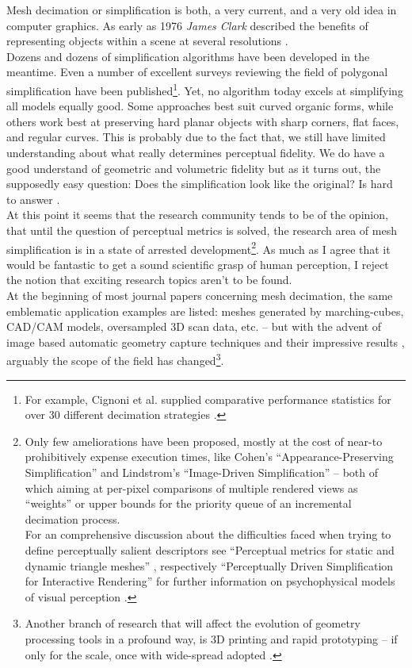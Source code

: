 Mesh decimation or simplification is both, a very current, and a very old idea in computer graphics.
As early as 1976 \textit{James Clark} described the benefits of representing objects within a scene at several resolutions \citep[cf.][]{Clark1976}.\\
Dozens and dozens of simplification algorithms have been developed in the meantime.
Even a number of excellent surveys reviewing the field of polygonal simplification have been published\footnote{ For example, Cignoni et al. supplied comparative performance statistics for over 30 different decimation strategies \citep[cf.][]{Cignoni1998, Heckbert1997}.}.
Yet, no algorithm today excels at simplifying all models equally good.
Some approaches best suit curved organic forms, while others work best at preserving hard planar objects with sharp corners, flat faces, and regular curves.
This is probably due to the fact that, we still have limited understanding about what really determines perceptual fidelity.
We do have a good understand of geometric and volumetric fidelity but as it turns out, the supposedly easy question:  Does the simplification look like the original?
Is hard to answer \citep[][cf. p.25]{Luebke2001}.\\
At this point it seems that the research community tends to be of the opinion, that until the question of perceptual metrics is solved, the research area of mesh simplification is in a state of arrested development\footnote{ Only few ameliorations have been proposed, mostly at the cost of near-to prohibitively expense execution times, like Cohen’s ``Appearance-Preserving Simplification'' \citep[cf.][]{Cohen1998} and Lindstrom’s ``Image-Driven Simplification'' \citep[cf.][]{Lindstrom2000} -- both of which aiming at per-pixel comparisons of multiple rendered views as ``weights'' or upper bounds for the priority queue of an incremental decimation process.\\For an comprehensive discussion about the difficulties faced when trying to define perceptually salient descriptors see ``Perceptual metrics for static and dynamic triangle meshes'' \citep[cf.][]{Corsini2012}, respectively ``Perceptually Driven Simplification for Interactive Rendering'' for further information on psychophysical models of visual perception \citep[][]{Luebke2001a}.}. 
As much as I agree that it would be fantastic to get a sound scientific grasp of human perception, I reject the notion that exciting research topics aren't to be found.\\
At the beginning of most journal papers concerning mesh decimation, the same emblematic application examples are listed: meshes generated by marching-cubes, CAD/CAM models, oversampled 3D scan data, etc. -- but with the advent of image based automatic geometry capture techniques and their impressive results \citep[cf.][]{Pollefeys2004,Snavely2008}, arguably the scope of the field has changed\footnote{ Another branch of research that will affect the evolution of geometry processing tools in a profound way, is 3D printing and rapid prototyping -- if only for the scale, once with wide-spread adopted \citep[cf.][]{Vilbrandt2008,Bickel2010}.}.
